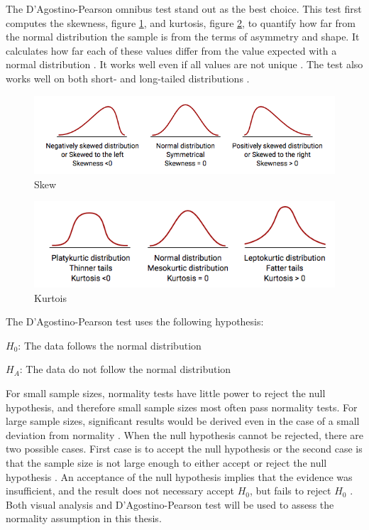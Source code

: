 The D'Agostino-Pearson omnibus test stand out as the best choice. This test first computes the skewness, figure \ref{fig:skew}, and kurtosis, figure \ref{fig:kurtois}, to quantify how far from the normal distribution the sample is from the terms of asymmetry and shape. It calculates how far each of these values differ from the value expected with a normal distribution \citep{Pearson2006}. It works well even if all values are not unique \citep{Motulsky2013}. The test also works well on both short- and long-tailed distributions \citep{Yap2011}. \newline  %

\begin{figure}[h!]
	\centering
	\includegraphics[width=0.7\linewidth]{"fig/skew"}
	\caption{Skew \citep{MedCalcSoftwarebvba2017}}
	\label{fig:skew}
\end{figure}

\begin{figure}[h!]
	\centering
	\includegraphics[width=0.7\linewidth]{fig/kurtois}
	\caption{Kurtois \citep{MedCalcSoftwarebvba2017}}
	\label{fig:kurtois}
\end{figure}


The D'Agostino-Pearson test uses the following hypothesis:\newline

\centerline{$H_{0}$: The data follows the normal distribution} 
\centerline{$H_{A}$: The data do not follow the normal distribution}

For small sample sizes, normality tests have little power to reject the null hypothesis, and therefore small sample sizes most often pass normality tests. For large sample sizes, significant results would be derived even in the case of a small deviation from normality \citep{Pearson2006}. When the null hypothesis cannot be rejected, there are two possible cases. First case is to accept the null hypothesis or the second case is that the sample size is not large enough to either accept or reject the null hypothesis \citep{ThePennsylvaniaStateUniversity2017}. An acceptance of the null hypothesis implies that the evidence was insufficient, and the result does not necessary accept $H_{0}$, but fails to reject $H_{0}$ \citep{Walpole2012}. Both visual analysis and D'Agostino-Pearson test will be used to assess the normality assumption in this thesis. 

